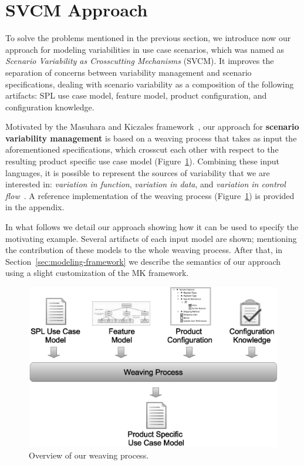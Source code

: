 \section{SVCM Approach}
\label{sec:svmc}

To solve the problems mentioned in the previous section, we introduce now our
approach for modeling variabilities in use case scenarios, which was named as
\emph{Scenario Variability as Crosscutting Mechanisms} (SVCM). It improves the
separation of concerns between variability management and scenario specifications, dealing with scenario variability as a composition of the
following artifacts: SPL use case model, feature model, product configuration,
and configuration knowledge.

Motivated by the Masuhara and Kiczales
framework~\cite{Masuhara:2003aa}, our approach for \textbf{scenario variability
management} is based on a weaving process that takes as input the aforementioned
specifications, which crosscut each other with respect to the resulting product
specific use case model (Figure~\ref{fig:weave-process}). Combining these input
languages, it is possible to represent the sources of variability that we are
interested in: \emph{variation in function}, \emph{variation in data}, and
\emph{variation in control flow}~\cite{Bachmann:2001aa}. A reference implementation of the weaving process (Figure~\ref{fig:weave-process}) is provided in the appendix.

In what follows we detail our approach showing how it
can be used to specify the motivating example. Several artifacts of each input model
are shown; mentioning the contribution of these models to the whole weaving
process. After that, in Section~\ref{sec:modeling-framework} we describe the semantics of our approach using a slight customization of the MK framework.

\begin{figure}[htb]
 \begin{center}
  \includegraphics[scale=0.30]{img/weave-process2.eps}
  \caption{Overview of our weaving process.}
  \label{fig:weave-process}
  \end{center}
\end{figure}

